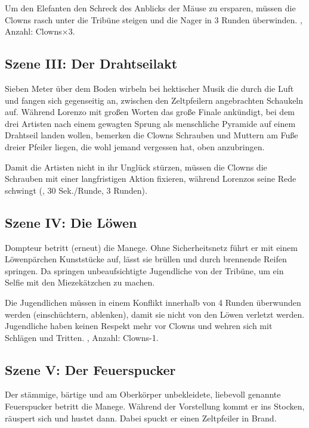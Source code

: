{		Um den Elefanten den Schreck des Anblicks der Mäuse zu ersparen, müssen die Clowns rasch unter die Tribüne steigen und die Nager in 3 Runden überwinden. , Anzahl: Clowns×3.


		\subsection{Szene III: Der Drahtseilakt}

		Sieben Meter über dem Boden wirbeln bei hektischer Musik die  durch die Luft und fangen sich gegenseitig an, zwischen den Zeltpfeilern angebrachten Schaukeln auf. Während Lorenzo mit großen Worten das große Finale ankündigt, bei dem drei Artisten nach einem gewagten Sprung als menschliche Pyramide auf einem Drahtseil landen wollen, bemerken die Clowns Schrauben und Muttern am Fuße dreier Pfeiler liegen, die wohl jemand vergessen hat, oben anzubringen.

		Damit die Artisten nicht in ihr Unglück stürzen, müssen die Clowns die Schrauben mit einer langfristigen Aktion fixieren, während Lorenzos seine Rede schwingt (, 30 Sek./Runde, 3 Runden).

		\subsection{Szene IV: Die Löwen}

		Dompteur  betritt (erneut) die Manege. Ohne Sicherheitsnetz führt er mit einem Löwenpärchen Kunststücke auf, lässt sie brüllen und durch brennende Reifen springen. Da springen unbeaufsichtigte Jugendliche von der Tribüne, um ein Selfie mit den Miezekätzchen zu machen.

		Die Jugendlichen müssen in einem Konflikt innerhalb von 4 Runden überwunden werden (einschüchtern, ablenken), damit sie nicht von den Löwen verletzt werden. Jugendliche haben keinen Respekt mehr vor Clowns und wehren sich mit Schlägen und Tritten. , Anzahl: Clowns-1.

		\subsection{Szene V: Der Feuerspucker}

		Der stämmige, bärtige und am Oberkörper unbekleidete, liebevoll  genannte Feuerspucker betritt die Manege. Während der Vorstellung kommt er ins Stocken, räuspert sich und hustet dann. Dabei spuckt er einen Zeltpfeiler in Brand.

}
